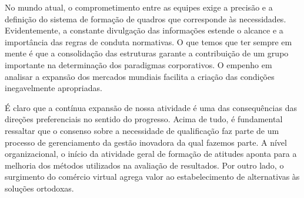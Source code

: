 \documentclass[
	12pt,				%
	oneside,			%
	a4paper,			%
	english,			%
	french,				%
	spanish,			%
	brazil				%
	]{abntex2}
\begin{document}
No mundo atual, o comprometimento entre as equipes exige a precisão e a
definição do sistema de formação de quadros que corresponde às
necessidades. Evidentemente, a constante divulgação das informações
estende o alcance e a importância das regras de conduta normativas. O
que temos que ter sempre em mente é que a consolidação das estruturas
garante a contribuição de um grupo importante na determinação dos
paradigmas corporativos. O empenho em analisar a expansão dos mercados
mundiais facilita a criação das condições inegavelmente apropriadas.

É claro que a contínua expansão de nossa atividade é uma das
consequências das direções preferenciais no sentido do progresso. Acima
de tudo, é fundamental ressaltar que o consenso sobre a necessidade de
qualificação faz parte de um processo de gerenciamento da gestão
inovadora da qual fazemos parte. A nível organizacional, o início da
atividade geral de formação de atitudes aponta para a melhoria dos
métodos utilizados na avaliação de resultados. Por outro lado, o
surgimento do comércio virtual agrega valor ao estabelecimento de
alternativas às soluções ortodoxas.

\postextual

\postextual



\end{document}
